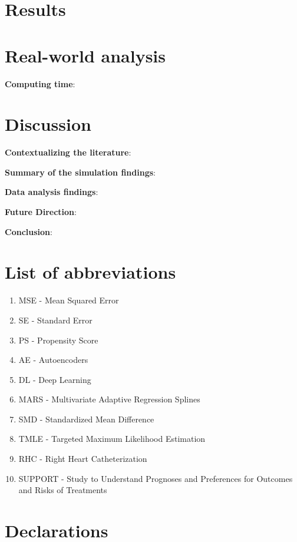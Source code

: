 \documentclass[sn-vancouver,Numbered,lineno,pdflatex]{sn-jnl}
\providecommand{\tightlist}{%
  \setlength{\itemsep}{0pt}\setlength{\parskip}{0pt}}
\begin{document}
\section{Results}\label{results}

\section{Real-world analysis}\label{real-world-analysis}

\textbf{Computing time}:

\section{Discussion}\label{discussion}

\textbf{Contextualizing the literature}:

\textbf{Summary of the simulation findings}:

\textbf{Data analysis findings}:

\textbf{Future Direction}:

\textbf{Conclusion}:

\section*{List of abbreviations}\label{list-of-abbreviations}

\begin{enumerate}
\def\labelenumi{\arabic{enumi}.}
\tightlist
\item
  MSE - Mean Squared Error
\item
  SE - Standard Error
\item
  PS - Propensity Score
\item
  AE - Autoencoders
\item
  DL - Deep Learning
\item
  MARS - Multivariate Adaptive Regression Splines
\item
  SMD - Standardized Mean Difference
\item
  TMLE - Targeted Maximum Likelihood Estimation
\item
  RHC - Right Heart Catheterization
\item
  SUPPORT - Study to Understand Prognoses and Preferences for Outcomes
  and Risks of Treatments
\end{enumerate}

\section*{Declarations}\label{declarations}
\end{document}
